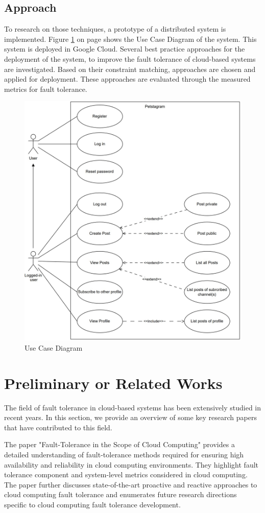 \documentclass[lettersize,journal]{IEEEtran}
\begin{document}
\subsection{Approach}
 To research on those techniques, a prototype of a distributed system is implemented. Figure \ref{fig:fig_1} on page \pageref{fig:fig_1} shows the Use Case Diagram of the system. This system is deployed in Google Cloud. Several best practice approaches for the deployment of the system, to improve the fault tolerance of cloud-based systems are investigated. Based on their constraint matching, approaches are chosen and applied for deployment. These approaches are evaluated through the measured metrics for fault tolerance.

\begin{figure}[!t]
    \centering
    \includegraphics[width=3.5 in]{use-case-diagram}
    \caption{Use Case Diagram}
    \label{fig:fig_1}
\end{figure}

\section{Preliminary or Related Works}
\noindent 
The field of fault tolerance in cloud-based systems has been extensively studied in recent years. In this section, we provide an overview of some key research papers that have contributed to this field.

The paper "Fault-Tolerance in the Scope of Cloud Computing" \cite{paper_faultTolerance} provides a detailed understanding of fault-tolerance methods required for ensuring high availability and reliability in cloud computing environments. They highlight fault tolerance component and system-level metrics considered in cloud computing. The paper further discusses state-of-the-art proactive and reactive approaches to cloud computing fault tolerance and enumerates future research directions specific to cloud computing fault tolerance development.
\end{document}
